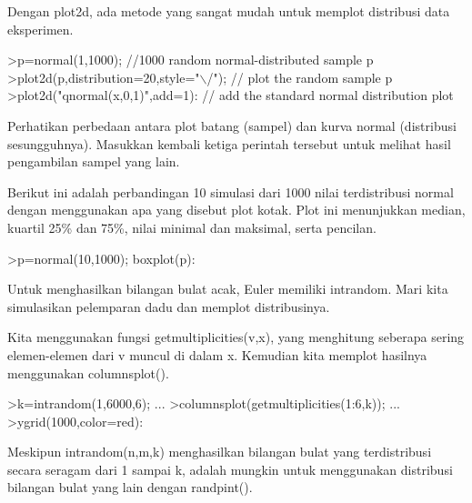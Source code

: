 \documentclass[12pt,Times new roman,letterpaper]{book}
\begin{document}
\begin{eulernootebook}
\begin{eulercomment}
\begin{eulercomment}
\begin{eulernootebook}
\begin{eulercomment}
\begin{eulercomment}
\begin{eulercomment}
\begin{eulercomment}
\begin{eulercomment}
\begin{eulercomment}
\begin{eulercomment}
\begin{eulercomment}
Dengan plot2d, ada metode yang sangat mudah untuk memplot distribusi
data eksperimen.
\end{eulercomment}
\begin{eulerprompt}
>p=normal(1,1000); //1000 random normal-distributed sample p
>plot2d(p,distribution=20,style="\(\backslash\)/"); // plot the random sample p
>plot2d("qnormal(x,0,1)",add=1): // add the standard normal distribution plot
\end{eulerprompt}
\begin{eulercomment}
Perhatikan perbedaan antara plot batang (sampel) dan kurva normal
(distribusi sesungguhnya). Masukkan kembali ketiga perintah tersebut
untuk melihat hasil pengambilan sampel yang lain.
\end{eulercomment}
\begin{eulercomment}
Berikut ini adalah perbandingan 10 simulasi dari 1000 nilai
terdistribusi normal dengan menggunakan apa yang disebut plot kotak.
Plot ini menunjukkan median, kuartil 25\% dan 75\%, nilai minimal dan
maksimal, serta pencilan.
\end{eulercomment}
\begin{eulerprompt}
>p=normal(10,1000); boxplot(p):
\end{eulerprompt}
\begin{eulercomment}
Untuk menghasilkan bilangan bulat acak, Euler memiliki intrandom. Mari
kita simulasikan pelemparan dadu dan memplot distribusinya.

Kita menggunakan fungsi getmultiplicities(v,x), yang menghitung
seberapa sering elemen-elemen dari v muncul di dalam x. Kemudian kita
memplot hasilnya menggunakan columnsplot().
\end{eulercomment}
\begin{eulerprompt}
>k=intrandom(1,6000,6);  ...
>columnsplot(getmultiplicities(1:6,k));  ...
>ygrid(1000,color=red):
\end{eulerprompt}
\begin{eulercomment}
Meskipun intrandom(n,m,k) menghasilkan bilangan bulat yang
terdistribusi secara seragam dari 1 sampai k, adalah mungkin untuk
menggunakan distribusi bilangan bulat yang lain dengan randpint().


\end{eulercomment}
\end{eulercomment}
\end{eulercomment}
\end{eulercomment}
\end{eulercomment}
\end{eulercomment}
\end{eulercomment}
\end{eulercomment}
\end{eulernootebook}
\end{eulercomment}
\end{eulercomment}
\end{eulernootebook}
\end{document}

